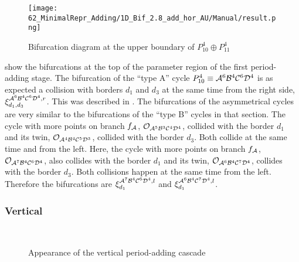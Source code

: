 \begin{figure}
    \centering
    \texttt{[image: 62\_MinimalRepr\_Adding/1D\_Bif\_2.8\_add\_hor\_AU/Manual/result.png]}
    \caption{Bifurcation diagram at the upper boundary of $P_{10}^4 \oplus P_{11}^4$}
    \label{fig:minrep.add.app.hor.bif.AU}
\end{figure}


 show the bifurcations at the top of the parameter region of the first period-adding stage.
The bifurcation of the ``type A'' cycle $P_{10}^4 \equiv \mathcal{A}^6\mathcal{B}^4\mathcal{C}^6\mathcal{D}^4$ is as expected a collision with borders $d_1$ and $d_3$ at the same time from the right side, $\xi_{d_1, d_3}^{\mathcal{A}^6\mathcal{B}^4\mathcal{C}^6\mathcal{D}^4, r}$.
This was described in .
The bifurcations of the asymmetrical cycles are very similar to the bifurcations of the ``type B'' cycles in that section.
The cycle with more points on branch $f_{\mathcal{A}}$, $\mathcal{O}_{\mathcal{A}^5\mathcal{B}^3\mathcal{C}^4\mathcal{D}^4}$, collided with the border $d_1$ and its twin, $\mathcal{O}_{\mathcal{A}^4\mathcal{B}^4\mathcal{C}^5\mathcal{D}^3}$, collided with the border $d_3$.
Both collide at the same time and from the left.
Here, the cycle with more points on branch $f_{\mathcal{A}}$, $\mathcal{O}_{\mathcal{A}^7\mathcal{B}^4\mathcal{C}^6\mathcal{D}^4}$, also collides with the border $d_1$ and its twin, $\mathcal{O}_{\mathcal{A}^6\mathcal{B}^4\mathcal{C}^7\mathcal{D}^4}$, collides with the border $d_3$.
Both collisions happen at the same time from the left.
Therefore the bifurcations are $\xi_{d_1}^{\mathcal{A}^7\mathcal{B}^4\mathcal{C}^6\mathcal{D}^4, l}$ and $\xi_{d_1}^{\mathcal{A}^6\mathcal{B}^4\mathcal{C}^7\mathcal{D}^4, l}$.

\subsubsection{Vertical}

\begin{figure}
    \centering
     \\
    \caption{Appearance of the vertical period-adding cascade}
    \label{fig:minrep.add.app.vert}
\end{figure}

